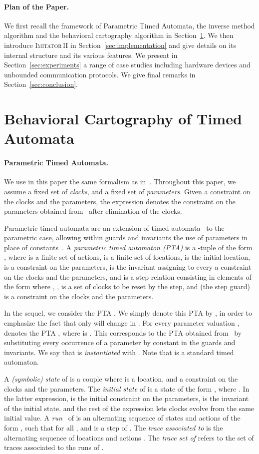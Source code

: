 \documentclass[submission,copyright,creativecommons]{eptcs}
\newcommand{\imitatordeux}{\textsc{Imitator}\,II}
\newcommand{\paragraphe}[1]{\paragraph{#1.}}
\begin{document}
\paragraphe{Plan of the Paper}
We first recall the framework of Parametric Timed Automata,
the inverse method algorithm and
the behavioral cartography algorithm in Section~\ref{sec:preliminaries}.
We then introduce \imitatordeux{} in Section~\ref{sec:implementation} and give details on its internal structure and its various features.
We present in Section~\ref{sec:experiments} a range of case studies including hardware devices and unbounded communication protocols.
We give final remarks in Section~\ref{sec:conclusion}.


\section{Behavioral Cartography of Timed Automata} \label{sec:preliminaries}






\paragraphe{Parametric Timed Automata} \label{ss:pta}


We use in this paper the same formalism as in~\cite{af10}.
Throughout this paper, we assume a fixed set  of \emph{clocks},
and a fixed set   of \emph{parameters}.
Given a constraint  on the clocks and the parameters, the expression  denotes the constraint on the parameters obtained from~ after elimination of the clocks.

Parametric timed automata are an extension of timed automata~\cite{ad94} to the parametric case, allowing within guards and invariants the use of parameters in place of constants~\cite{ahv93}.
A {\em parametric timed automaton (PTA)}  is a -tuple of the form
\mbox{},
where
 is a finite set of actions,
 is a finite set of locations,
 is the initial location,
 is a constraint on the parameters,  is the invariant assigning to every 
a constraint  on the clocks and the parameters, and
 is a step relation consisting in elements of the form   where
, ,  is a set of clocks to be reset by the step, and
 (the step guard) is a constraint on the clocks and the parameters.

In the sequel, we consider the PTA .
We simply denote this PTA by , in order to emphasize the fact that only  will change in .
For every parameter valuation ,
 denotes the PTA
,
where  is .
This corresponds to the PTA obtained from~ by substituting every occurrence of a parameter  by constant  in the guards and invariants.
We say that  is \emph{instantiated} with .
Note that  is a standard timed automaton.


A {\em (symbolic) state}  of  is a couple  where  is a location, and  a constraint on the clocks and the parameters.
The \emph{initial state} of  is a state  of the form ,
where .
In the latter expression,  is the initial constraint on the parameters,  is the invariant of the initial state, and the rest of the expression lets clocks evolve from the same initial value.
A {\em run}~ of  is an alternating sequence of states and actions of the form
,
such that for all ,
 and  is a step of .
The \emph{trace associated to } is the alternating sequence of locations and actions
.
The \emph{trace set of } refers to the set of traces associated to the runs of .
\end{document}

